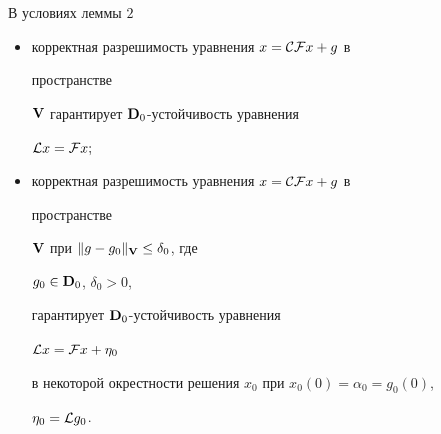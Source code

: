 \begin{lem}


В условиях леммы $2$


\begin{itemize}


\item[а)] корректная разрешимость уравнения $x={\cal C}{\cal F}x+g$ в


пространстве


$\bold {V}$ гарантирует $\bold {D}_0$-устойчивость уравнения


${\cal L}x={\cal F}x;$


\item[б)] корректная разрешимость уравнения $x={\cal C}{\cal F}x+g$ в


пространстве


$\bold {V}$ при $\|g-g_0\|_{\bold V}\le\delta_0$, где


$g_0\in\bold {D}_0$, $\delta_0>0$,


гарантирует $\bold {D}_0$-устойчивость уравнения


${\cal L}x={\cal F}x+\eta_0$


в некоторой окрестности решения $x_0$ при $x_0(0)=\alpha_0=g_0(0)$,


$\eta_0={\cal L}g_0$.


\end{itemize}


\end{lem}






